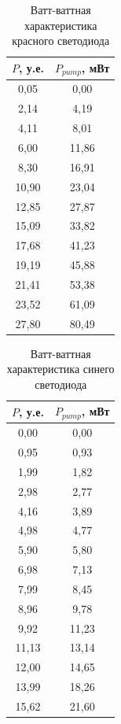 \documentclass[a4paper,12pt]{report}
\begin{document}
\begin{table}[H]
\begin{tabular}{|c|c|}
\hline
$P$, у.е. & $P_{pump}$, мВт \\ \hline
0,05        & 0,00          \\ \hline
2,14        & 4,19     \\ \hline
4,11        & 8,01     \\ \hline
6,00        & 11,86    \\ \hline
8,30        & 16,91      \\ \hline
10,90       & 23,04    \\ \hline
12,85       & 27,87     \\ \hline
15,09       & 33,82    \\ \hline
17,68       & 41,23    \\ \hline
19,19       & 45,88    \\ \hline
21,41       & 53,38     \\ \hline
23,52       & 61,09    \\ \hline
27,80        & 80,49    \\ \hline
\end{tabular}
\caption{Ватт-ваттная характеристика красного светодиода}
\label{tab.3}
\end{table}

\begin{table}[H]
\begin{tabular}{|c|c|}
\hline
$P$, у.е. & $P_{pump}$, мВт \\ \hline
0,00           & 0,00          \\ \hline
0,95        & 0,93     \\ \hline
1,99        & 1,82     \\ \hline
2,98        & 2,77     \\ \hline
4,16        & 3,89      \\ \hline
4,98        & 4,77     \\ \hline
5,90         & 5,80     \\ \hline
6,98        & 7,13      \\ \hline
7,99        & 8,45     \\ \hline
8,96        & 9,78     \\ \hline
9,92        & 11,23    \\ \hline
11,13       & 13,14    \\ \hline
12,00          & 14,65     \\ \hline
13,99       & 18,26    \\ \hline
15,62       & 21,60    \\ \hline
\end{tabular}
\caption{Ватт-ваттная характеристика синего светодиода}
\label{tab.4}
\end{table}
\end{document}
